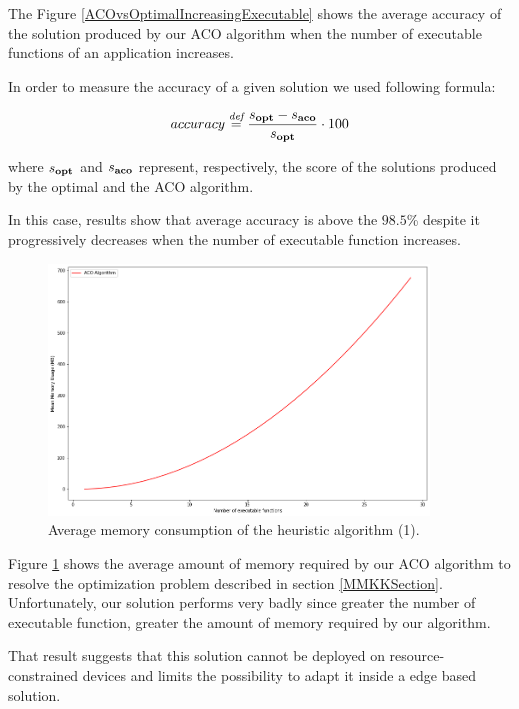 \documentclass[12pt,a4paper]{report}
\newcommand{\mathDef}{\overset{\textit{def}}{=}}
\begin{document}
The Figure \ref{ACOvsOptimalIncreasingExecutable} shows the average accuracy of the solution produced by our ACO algorithm when the number of executable functions of an application increases. 

In order to measure the accuracy of a given solution we used following formula:

\begin{equation}
	accuracy \mathDef \dfrac{s_{\text{\textbf{opt}}} - s_{\text{\textbf{aco}}}}{s_{\text{\textbf{opt}}}} \cdot 100
\end{equation}

where $s_{\text{\textbf{opt}}}$ and $s_{\text{\textbf{aco}}}$ represent, respectively, the score of the solutions produced by the optimal and the ACO algorithm.

In this case, results show that average accuracy is above the $98.5$\% despite it progressively decreases when the number of executable function increases. 

\begin{figure}[h]
	\centering
	\includegraphics[width=0.9\textwidth]{./Images/ACORamConsumptionIncreasingExecutable.png}
	\caption{Average memory consumption of the heuristic algorithm (1).}%
	\label{ACORamConsumptionIncreasingExecutable}
\end{figure}

Figure \ref{ACORamConsumptionIncreasingExecutable} shows the average amount of memory required by our ACO algorithm to resolve the optimization problem described in section \ref{MMKKSection}. Unfortunately, our solution performs very badly since greater the number of executable function, greater the amount of memory required by our algorithm. 

That result suggests that this solution cannot be deployed on resource-constrained devices and limits the possibility to adapt it inside a edge based solution.
\end{document}

